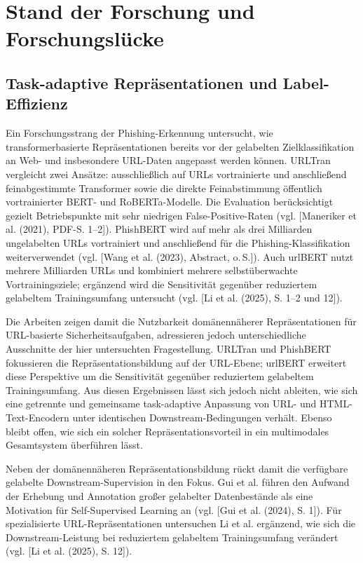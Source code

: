 \chapter{Stand der Forschung und Forschungslücke}

\section{Task-adaptive Repräsentationen und Label-Effizienz}

Ein Forschungsstrang der Phishing-Erkennung untersucht, wie transformerbasierte
Repräsentationen bereits vor der gelabelten Zielklassifikation an Web- und insbesondere
URL-Daten angepasst werden können. URLTran vergleicht zwei Ansätze: ausschließlich
auf URLs vortrainierte und anschließend feinabgestimmte Transformer sowie die direkte
Feinabstimmung öffentlich vortrainierter BERT- und RoBERTa-Modelle. Die Evaluation
berücksichtigt gezielt Betriebspunkte mit sehr niedrigen False-Positive-Raten
(vgl. [Maneriker et al. (2021), PDF-S. 1--2]). PhishBERT wird auf mehr als drei Milliarden
ungelabelten URLs vortrainiert und anschließend für die Phishing-Klassifikation
weiterverwendet (vgl. [Wang et al. (2023), Abstract, o.\,S.]). Auch urlBERT nutzt mehrere Milliarden
URLs und kombiniert mehrere selbstüberwachte Vortrainingsziele; ergänzend wird die
Sensitivität gegenüber reduziertem gelabeltem Trainingsumfang untersucht
(vgl. [Li et al. (2025), S. 1--2 und 12]).

Die Arbeiten zeigen damit die Nutzbarkeit domänennäherer Repräsentationen für
URL-basierte Sicherheitsaufgaben, adressieren jedoch unterschiedliche Ausschnitte der
hier untersuchten Fragestellung. URLTran und PhishBERT fokussieren die
Repräsentationsbildung auf der URL-Ebene; urlBERT erweitert diese Perspektive um die
Sensitivität gegenüber reduziertem gelabeltem Trainingsumfang. Aus diesen Ergebnissen
lässt sich jedoch nicht ableiten, wie sich eine getrennte und gemeinsame task-adaptive
Anpassung von URL- und HTML-Text-Encodern unter identischen Downstream-Bedingungen
verhält. Ebenso bleibt offen, wie sich ein solcher Repräsentationsvorteil in ein
multimodales Gesamtsystem überführen lässt.

Neben der domänennäheren Repräsentationsbildung rückt damit die verfügbare gelabelte
Downstream-Supervision in den Fokus. Gui et al. führen den Aufwand der Erhebung und
Annotation großer gelabelter Datenbestände als eine Motivation für Self-Supervised Learning
an (vgl. [Gui et al. (2024), S. 1]). Für spezialisierte URL-Repräsentationen untersuchen
Li et al. ergänzend, wie sich die Downstream-Leistung bei reduziertem gelabeltem
Trainingsumfang verändert (vgl. [Li et al. (2025), S. 12]).

